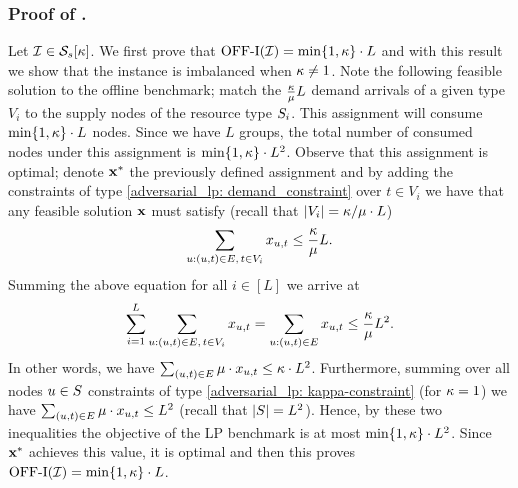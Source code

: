 \subsubsection[]{Proof of .}
\label{proof: AdvOfflineInstCL}
Let $\mathcal I \in \mathcal{S}_s[\kappa]$. We first prove that $\mathrm{\mathrm{OFF}}\textrm{-}\mathrm{I}(\mathcal I) = \min\{1,\kappa\} \cdot L$ and with this result we show that the instance is imbalanced when $\kappa \neq 1$. Note the following feasible solution to the offline benchmark; match the $\frac{\kappa}{\mu} L$ demand arrivals of a given type $V_i$ to the supply nodes of the resource type $S_i$. This assignment will consume $\min\{1, \kappa \} \cdot L$ nodes. Since we have $L$ groups, the total number of consumed nodes under this assignment is $\min\{1, \kappa \} \cdot L^2$. Observe that this assignment is optimal; denote $\mathbf{x}^*$ the previously defined assignment and by adding the constraints of type \eqref{adversarial_lp: demand_constraint} over $t \in V_i$ we have that any feasible solution $\mathbf{x}$ must satisfy (recall that $|V_i| = \kappa/\mu \cdot L$)
\begin{equation*}
    \sum_{u: (u,t) \in E,\, t \in V_i} x_{u,t} \leq \frac{\kappa}{\mu} L.
\end{equation*}
Summing the above equation for all $i \in [L]$ we arrive at
\begin{equation*}
    \sum_{i=1}^L \sum_{u: (u,t) \in E,\, t \in V_i} x_{u,t} = \sum_{u: (u,t) \in E} x_{u,t} \leq \frac{\kappa}{\mu} L^2.
\end{equation*}
In other words, we have $\sum_{(u,t) \in E} \mu \cdot x_{u,t} \leq \kappa \cdot L^2$. Furthermore, summing over all nodes $u \in S$ constraints of type \eqref{adversarial_lp: kappa-constraint} (for $\kappa=1$) we have $\sum_{(u,t) \in E} \mu \cdot x_{u,t} \leq L^2$ (recall that $|S| = L^2$). Hence, by these two inequalities the objective of the LP benchmark is at most $\min\{1, \kappa \} \cdot L^2$. Since $\mathbf{x}^*$ achieves this value, it is optimal and then this proves $\mathrm{\mathrm{OFF}}\textrm{-}\mathrm{I}(\mathcal I) = \min\{1,\kappa\} \cdot L$.

